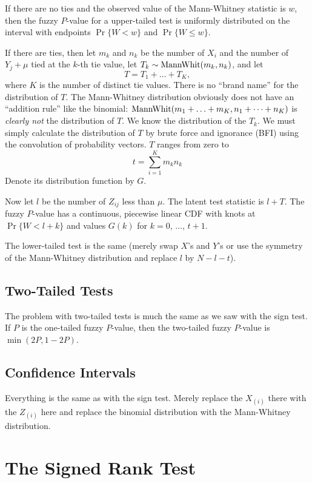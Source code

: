 \documentclass{article}
\newcommand{\MannWhitneyDis}{\text{\upshape MannWhit}}
\begin{document}
If there are no ties and the observed value of the Mann-Whitney statistic
is $w$, then the fuzzy $P$-value for a upper-tailed test is uniformly
distributed on the interval with endpoints $\Pr\{ W < w \}$
and $\Pr \{ W \le w \}$.

If there are ties, then let $m_k$ and $n_k$ be the number of $X_i$ and the
number of $Y_j + \mu$ tied at the $k$-th tie value,
let $T_k \sim \MannWhitneyDis(m_k, n_k)$,
and let
$$
   T = T_1 + \ldots + T_K,
$$
where $K$ is the number of distinct tie values.  There is no ``brand name''
for the distribution of $T$.  The Mann-Whitney distribution obviously does
not have an ``addition rule'' like the binomial:
$\MannWhitneyDis(m_1 + \ldots + m_K, n_1 + \cdots + n_K)$ is \emph{clearly not}
the distribution of $T$.  We know the distribution of the $T_k$.
We must simply calculate the distribution of $T$ by brute force and ignorance
(BFI) using the convolution of probability vectors.
$T$ ranges from zero to
$$
   t = \sum_{i = 1}^K m_k n_k
$$
Denote its distribution function by $G$.

Now let $l$ be the number of $Z_{i j}$ less than $\mu$.  The latent test
statistic is $l + T$.  The fuzzy $P$-value has a continuous, piecewise linear
CDF with knots at $\Pr\{ W < l + k \}$ and values $G(k)$
for $k = 0$, $\ldots$, $t + 1$.

The lower-tailed test is the same (merely swap $X$'s and $Y$'s or use the
symmetry of the Mann-Whitney distribution and replace $l$ by $N - l - t$).

\subsection{Two-Tailed Tests}

The problem with two-tailed tests is much the same as we saw with the
sign test.  If $P$ is the one-tailed
fuzzy $P$-value, then the two-tailed
fuzzy $P$-value is $\min(2 P, 1 - 2 P)$.

\subsection{Confidence Intervals}

Everything is the same as with the sign test.  Merely replace the $X_{(i)}$
there with the $Z_{(i)}$ here and replace the binomial distribution with
the Mann-Whitney distribution.

\section{The Signed Rank Test}
\end{document}
